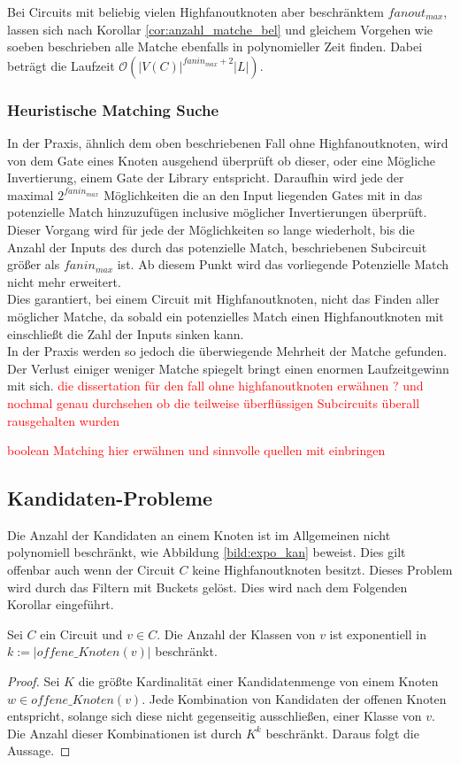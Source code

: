 \documentclass[11pt, a4paper, german]{article}
\begin{document}
Bei Circuits mit beliebig vielen Highfanoutknoten aber beschränktem $fanout_{max}$, lassen sich nach Korollar \ref{cor:anzahl_matche_bel} und gleichem Vorgehen wie soeben beschrieben alle Matche ebenfalls in polynomieller Zeit finden. Dabei beträgt die Laufzeit $\mathcal{O}(|V(C)|^{fanin_{max}+2}|L|)$.

\subsubsection{Heuristische Matching Suche}
In der Praxis, ähnlich dem oben beschriebenen Fall ohne Highfanoutknoten, wird von dem Gate eines Knoten ausgehend überprüft ob dieser, oder eine Mögliche Invertierung, einem Gate der Library entspricht. Daraufhin wird jede der maximal $2^{fanin_{max}}$ Möglichkeiten die an den Input liegenden Gates mit in das potenzielle Match hinzuzufügen inclusive möglicher Invertierungen überprüft. Dieser Vorgang wird für jede der Möglichkeiten so lange wiederholt, bis die Anzahl der Inputs des durch das potenzielle Match,  beschriebenen Subcircuit größer als $fanin_{max}$ ist. Ab diesem Punkt wird das vorliegende Potenzielle Match nicht mehr erweitert. \\
Dies garantiert, bei einem Circuit mit Highfanoutknoten, nicht das Finden aller möglicher Matche, da sobald ein potenzielles Match einen Highfanoutknoten mit einschließt die Zahl der Inputs sinken kann. \\
In der Praxis werden so jedoch die überwiegende Mehrheit der Matche gefunden. Der Verlust einiger weniger Matche spiegelt bringt einen enormen Laufzeitgewinn mit sich.
\textcolor{red}{die dissertation für den fall ohne highfanoutknoten erwähnen ? und nochmal genau durchsehen ob die teilweise überflüssigen Subcircuits überall rausgehalten wurden }

\textcolor{red}{boolean Matching hier erwähnen und sinnvolle quellen mit einbringen}

\subsection{Kandidaten-Probleme}
\label{subsec:kand_prob}
Die Anzahl der Kandidaten an einem Knoten ist im Allgemeinen nicht polynomiell beschränkt, wie Abbildung \ref{bild:expo_kan} beweist. Dies gilt offenbar auch wenn der Circuit $C$ keine Highfanoutknoten besitzt. Dieses Problem wird durch das Filtern mit Buckets gelöst. Dies wird nach dem Folgenden Korollar eingeführt. 
\begin{cor}
Sei $C$ ein Circuit und $v \in C$. Die Anzahl der Klassen von $v$ ist exponentiell in $k:= |offene\_Knoten(v)|$ beschränkt.
\end{cor}
\begin{proof}
Sei $K$ die größte Kardinalität einer Kandidatenmenge von einem Knoten $w\in offene\_Knoten(v)$. Jede Kombination von Kandidaten der offenen Knoten entspricht, solange sich diese nicht gegenseitig ausschließen, einer Klasse von $v$. Die Anzahl dieser Kombinationen ist durch $K^k$ beschränkt. Daraus folgt die Aussage.
\end{proof}
\end{document}
